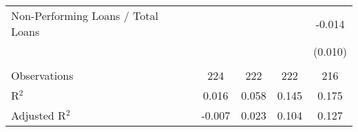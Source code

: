 \begin{table}[htbp]
\begin{adjustbox}{width = 1\textwidth, center}
\begin{tabular}{lcccc}
         Non-Performing Loans / Total Loans     &               &              &                & -0.014\\   
                                                &               &              &                & (0.010)\\   
          \\
         Observations                           & 224           & 222          & 222            & 216\\  
         R$^2$                                  & 0.016         & 0.058        & 0.145          & 0.175\\  
         Adjusted R$^2$                         & -0.007        & 0.023        & 0.104          & 0.127\\  
         \bottomrule
      \end{tabular}
   \end{adjustbox}
\end{table}



